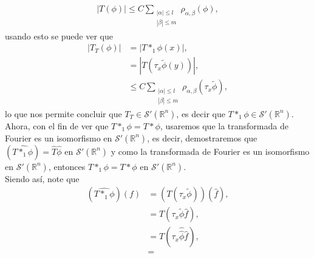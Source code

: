 \begin{homeworkProblem}
\begin{solution}
      \begin{align*}
        |T(\phi)|\leq C\sum_{\substack{|\alpha|\leq l\\ |\beta|\leq m}}\rho_{\alpha,\beta}(\phi),
      \end{align*}
      usando esto se puede ver que
      \begin{align*}
        |T_{T}(\phi)|&=\left| T*_{1}\phi(x) \right|,\\
        &=\left| T\left( \tau_{x}\tilde{\phi}(y) \right) \right|,\\
        &\leq C\sum_{\substack{|\alpha|\leq l\\|\beta|\leq m}}\rho_{\alpha,\beta}(\tau_{x}\tilde{\phi}),
      \end{align*}
      lo que nos permite concluir que $T_{T}\in\mathcal{S}'(\mathbb{R}^{n})$, es decir que $T*_{1}\phi\in\mathcal{S}'(\mathbb{R}^{n})$.\\
      Ahora, con el fin de ver que $T*_{1}\phi=T*\phi$, usaremos que la transformada de Fourier es un isomorfismo en $\mathcal{S}'(\mathbb{R}^{n})$, es decir, demostraremos que $\left(\hat{T*_{1}\phi}\right)=\hat{T}\hat{\phi}$ en $\mathcal{S}'(\mathbb{R}^{n})$ y como la transformada de Fourier es un isomorfismo en $\mathcal{S}'(\mathbb{R}^{n})$, entonces $T*_{1}\phi=T*\phi$ en $\mathcal{S}'(\mathbb{R}^{n})$.\\
      Siendo así, note que
      \begin{align*}
        \left( \hat{T*_{1}\phi} \right)(f)&=\left( T(\tau_{x}\tilde{\phi}) \right)(\hat{f}),\\
        &=T(\tau_{x}\tilde{\phi}\hat{f}),\\
        &=T(\tau_{x}\hat{\hat{\phi}}\hat{f}),\\
        &=
      \end{align*}
  \end{solution}
\end{homeworkProblem}
